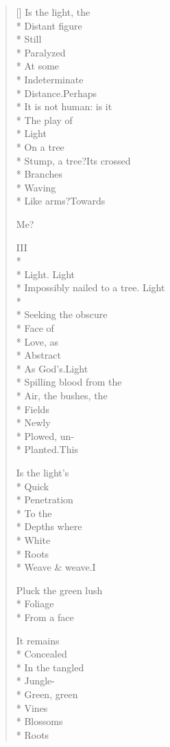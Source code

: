 \begin{verse}[\versewidth]
Is the light, the\\*
Distant figure\\*
Still\\*
Paralyzed \\*
At some\\*
Indeterminate\\*
Distance.\quad Perhaps\\*
It is not human: is it\\*
The play of \\*
Light\\*
On a tree\\*
Stump, a tree?\quad Its crossed\\*
Branches\\*
Waving\\*
Like arms?\quad Towards

Me?

\hspace{0.45\versewidth} III\\*
~\\*
Light. Light\\*
Impossibly nailed to a tree.  Light\\*
~\\*
Seeking the obscure\\*
Face of\\*
Love, as\\*
Abstract\\*
As God's.\quad Light\\*
Spilling blood from the\\*
Air, the bushes, the\\*
Fields\\*
Newly \\*
Plowed, un-\\*
Planted.\quad This

Is the light's\\*
Quick\\*
Penetration\\*
To the\\*
Depths where\\*
White\\*
Roots\\*
Weave \& weave.\qquad I

Pluck the green lush\\*
Foliage\\*
From a face

It remains \\*
Concealed\\*
In the tangled\\*
Jungle-\\*
Green, green\\*
Vines\\*
Blossoms\\*
Roots


\end{verse}
